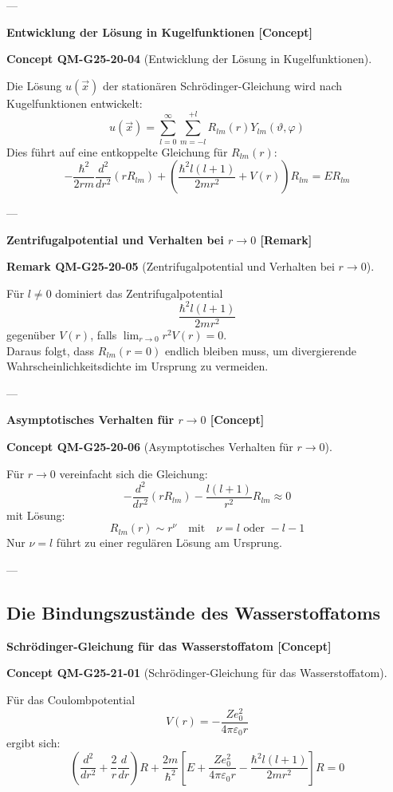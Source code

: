 \documentclass[10pt, letterpaper]{article}
\newcommand{\CustomHeading}[3]{%
  \par\medskip\noindent%
  \textbf{#1 #2} \textnormal{(#3)}.\enskip%
}
\newenvironment{REM}[2]{\begin{unitbox}\CustomHeading{Remark}{#1}{#2}}{\end{unitbox}}
\newenvironment{CONC}[2]{\begin{unitbox}\CustomHeading{Concept}{#1}{#2}}{\end{unitbox}}
\begin{document}
---

\textbf{Entwicklung der Lösung in Kugelfunktionen [Concept]}

\begin{CONC}{QM-G25-20-04}{Entwicklung der Lösung in Kugelfunktionen}
Die Lösung $u(\vec{x})$ der stationären Schrödinger-Gleichung wird nach Kugelfunktionen entwickelt:
\[
u(\vec{x}) = \sum_{l=0}^\infty \sum_{m=-l}^{+l} R_{lm}(r) Y_{lm}(\vartheta, \varphi)
\]
Dies führt auf eine entkoppelte Gleichung für $R_{lm}(r)$:
\[
-\frac{\hbar^2}{2 r m} \frac{d^2}{d r^2} (r R_{lm}) + \left( \frac{\hbar^2 l(l+1)}{2mr^2} + V(r) \right) R_{lm} = E R_{lm}
\]
\end{CONC}

---

\textbf{Zentrifugalpotential und Verhalten bei $r \to 0$ [Remark]}

\begin{REM}{QM-G25-20-05}{Zentrifugalpotential und Verhalten bei $r \to 0$}
Für $l \neq 0$ dominiert das Zentrifugalpotential
\[
\frac{\hbar^2 l(l+1)}{2 m r^2}
\]
gegenüber $V(r)$, falls $\lim_{r \to 0} r^2 V(r) = 0$.\\
Daraus folgt, dass $R_{lm}(r=0)$ endlich bleiben muss, um divergierende Wahrscheinlichkeitsdichte im Ursprung zu vermeiden.
\end{REM}

---

\textbf{Asymptotisches Verhalten für $r \to 0$ [Concept]}

\begin{CONC}{QM-G25-20-06}{Asymptotisches Verhalten für $r \to 0$}
Für $r \to 0$ vereinfacht sich die Gleichung:
\[
-\frac{d^2}{d r^2}(r R_{lm}) - \frac{l(l+1)}{r^2} R_{lm} \approx 0
\]
mit Lösung:
\[
R_{lm}(r) \sim r^\nu \quad \text{mit} \quad \nu = l \text{ oder } -l-1
\]
Nur $\nu = l$ führt zu einer regulären Lösung am Ursprung.
\end{CONC}

---


\pagebreak


\subsection{Die Bindungszustände des Wasserstoffatoms}

\textbf{Schrödinger-Gleichung für das Wasserstoffatom [Concept]}

\begin{CONC}{QM-G25-21-01}{Schrödinger-Gleichung für das Wasserstoffatom}
Für das Coulombpotential
\[
V(r) = -\frac{Z e_0^2}{4\pi \varepsilon_0 r}
\]
ergibt sich:
\[
\left( \frac{d^2}{dr^2} + \frac{2}{r} \frac{d}{dr} \right) R + \frac{2m}{\hbar^2} \left[ E + \frac{Z e_0^2}{4\pi \varepsilon_0 r} - \frac{\hbar^2 l(l+1)}{2 m r^2} \right] R = 0
\]
\end{CONC}
\end{document}
